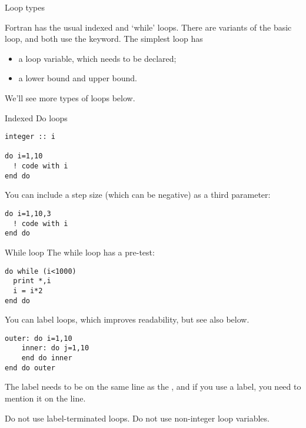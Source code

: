 
 {Loop types}

Fortran has the usual indexed and `while' loops. There are variants of the
basic loop, and both use the  keyword. The simplest loop has
\begin{itemize}
\item a loop variable, which needs to be declared;
\item a lower bound and upper bound.
\end{itemize}
We'll see more types of loops below.

\begin{block}{Indexed Do loops}
  \label{sl:doloop}
\begin{lstlisting}
integer :: i

do i=1,10
  ! code with i
end do
\end{lstlisting}

You can include a step size (which can be negative) as a third parameter:
\begin{lstlisting}
do i=1,10,3
  ! code with i
end do
\end{lstlisting}
\end{block}

\begin{block}{While loop}
  \label{sl:whilef}
  The while loop has a pre-test:
\begin{lstlisting}
do while (i<1000)
  print *,i
  i = i*2
end do
\end{lstlisting}
\end{block}

You can label loops, which improves readability, but see also below.
\begin{lstlisting}
outer: do i=1,10
    inner: do j=1,10
    end do inner
end do outer
\end{lstlisting}
The label needs to be on the same line as the , and if you use a
label, you need to mention it on the  line.

\begin{f77note}
  Do not use label-terminated loops. Do not use non-integer loop variables.
\end{f77note}


